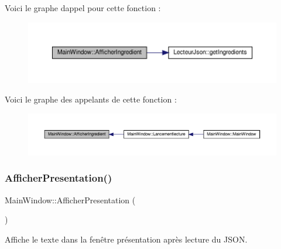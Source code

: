 Voici le graphe d\textquotesingle{}appel pour cette fonction \+:
\nopagebreak
\begin{figure}[H]
\begin{center}
\leavevmode
\includegraphics[width=350pt]{class_main_window_ad4059abf16eb904f988371b3791002bf_cgraph}
\end{center}
\end{figure}
Voici le graphe des appelants de cette fonction \+:
\nopagebreak
\begin{figure}[H]
\begin{center}
\leavevmode
\includegraphics[width=350pt]{class_main_window_ad4059abf16eb904f988371b3791002bf_icgraph}
\end{center}
\end{figure}
\mbox{\label{class_main_window_a9bf06dfcc398454facb39e71ebf32550}} 
\subsubsection{\texorpdfstring{Afficher\+Presentation()}{AfficherPresentation()}}
{\footnotesize\ttfamily Main\+Window\+::\+Afficher\+Presentation (\begin{DoxyParamCaption}{ }\end{DoxyParamCaption})}



Affiche le texte dans la fenêtre présentation après lecture du J\+S\+ON. 

